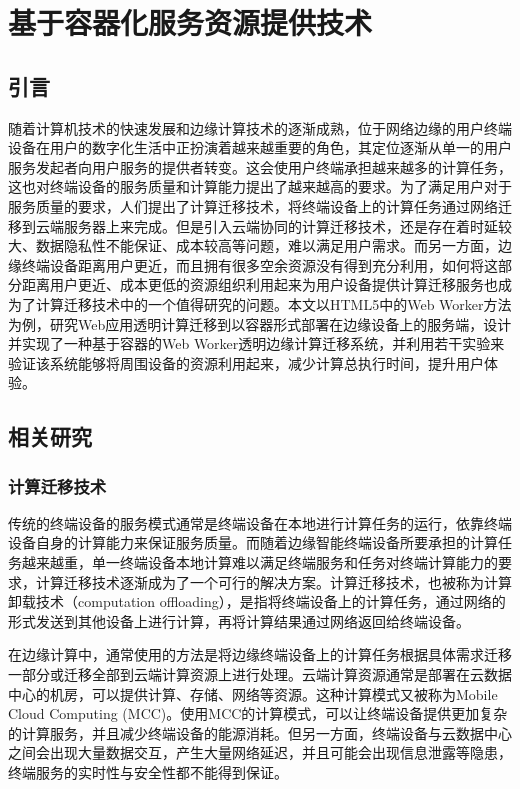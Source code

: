 
\chapter{基于容器化服务资源提供技术}\label{chap:computation_offloading}

\section{引言}

随着计算机技术的快速发展和边缘计算技术的逐渐成熟，位于网络边缘的用户终端设备在用户的数字化生活中正扮演着越来越重要的角色，其定位逐渐从单一的用户服务发起者向用户服务的提供者转变。这会使用户终端承担越来越多的计算任务，这也对终端设备的服务质量和计算能力提出了越来越高的要求。为了满足用户对于服务质量的要求，人们提出了计算迁移技术，将终端设备上的计算任务通过网络迁移到云端服务器上来完成。但是引入云端协同的计算迁移技术，还是存在着时延较大、数据隐私性不能保证、成本较高等问题，难以满足用户需求。而另一方面，边缘终端设备距离用户更近，而且拥有很多空余资源没有得到充分利用，如何将这部分距离用户更近、成本更低的资源组织利用起来为用户设备提供计算迁移服务也成为了计算迁移技术中的一个值得研究的问题。本文以HTML5中的Web Worker方法为例，研究Web应用透明计算迁移到以容器形式部署在边缘设备上的服务端，设计并实现了一种基于容器的Web Worker透明边缘计算迁移系统，并利用若干实验来验证该系统能够将周围设备的资源利用起来，减少计算总执行时间，提升用户体验。

\section{相关研究} 


\subsection{计算迁移技术}

传统的终端设备的服务模式通常是终端设备在本地进行计算任务的运行，依靠终端设备自身的计算能力来保证服务质量。而随着边缘智能终端设备所要承担的计算任务越来越重，单一终端设备本地计算难以满足终端服务和任务对终端计算能力的要求，计算迁移技术逐渐成为了一个可行的解决方案。计算迁移技术，也被称为计算卸载技术（computation offloading），是指将终端设备上的计算任务，通过网络的形式发送到其他设备上进行计算，再将计算结果通过网络返回给终端设备。

在边缘计算中，通常使用的方法是将边缘终端设备上的计算任务根据具体需求迁移一部分或迁移全部到云端计算资源上进行处理。云端计算资源通常是部署在云数据中心的机房，可以提供计算、存储、网络等资源。这种计算模式又被称为Mobile Cloud Computing (MCC)。使用MCC的计算模式，可以让终端设备提供更加复杂的计算服务，并且减少终端设备的能源消耗。但另一方面，终端设备与云数据中心之间会出现大量数据交互，产生大量网络延迟，并且可能会出现信息泄露等隐患，终端服务的实时性与安全性都不能得到保证。

